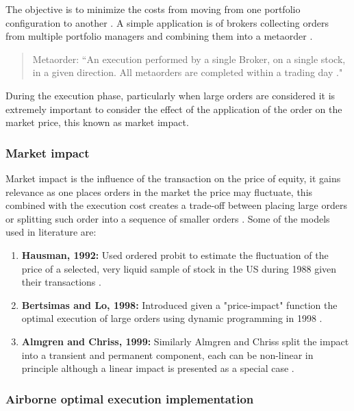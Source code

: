 The objective is to minimize the costs from moving from one portfolio configuration to another \cite{OptimalExecutionReview}. A simple application is of brokers collecting orders from multiple portfolio managers and combining them into a metaorder \cite{slides_on_optimal_execution}.  

\begin{quote}
    Metaorder: ``An execution performed by a single Broker, on a single stock, in a given direction. All metaorders are completed within a trading day \cite{slides_on_optimal_execution}."
\end{quote}

During the execution phase, particularly when large orders are considered it is extremely important to consider the effect of the application of the order on the market price, this known as market impact.

\subsubsection{Market impact} \label{sec::market_impact}
Market impact is the influence of the transaction on the price of equity, it gains relevance as one places orders in the market the price may fluctuate, this combined with the execution cost creates a trade-off between placing large orders or splitting such order into a sequence of smaller orders \cite{FinancialMathematics_marketImpact}. Some of the models used in literature are:

\begin{enumerate}
    \item \textbf{Hausman, 1992:} Used ordered probit to estimate the fluctuation of the price of a selected, very liquid sample of stock in the US during 1988 given their transactions \cite{hausman_marketImpact_probitModel}.
    \item \textbf{Bertsimas and Lo, 1998:} Introduced given a "price-impact" function the optimal execution of large orders using dynamic programming in 1998 \cite{Bertsimas_early_marketImpact}.
    \item \textbf{Almgren and Chriss, 1999:} Similarly Almgren and Chriss split the impact into a transient and permanent component, each can be non-linear in principle although a linear impact is presented as a special case \cite{almgren2001optimal}.
\end{enumerate}


\subsubsection{Airborne optimal execution implementation}

